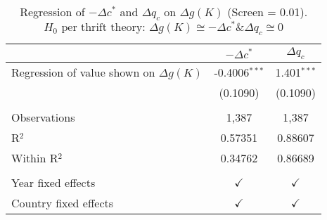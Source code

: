 \begin{table}[pos=h]
\caption{Regression of $- \Delta c^*$ and $\Delta q_c$ on $\Delta g(K)$ (Screen = 0.01). $H_0 \text{ per thrift theory: } \Delta g(K) \cong -\Delta c^* \& \Delta q_c \cong 0$}
\centering
\begin{tabularx}{\columnwidth}{lcc}
   \toprule
                                               & $-\Delta c^*$   & $\Delta q_c$ \\    
   \midrule 
   Regression of value shown on $\Delta g(K)$  & -0.4006$^{***}$ & 1.401$^{***}$\\   
                                               & (0.1090)        & (0.1090)\\   
    \\
   Observations                                & 1,387           & 1,387\\  
   R$^2$                                       & 0.57351         & 0.88607\\  
   Within R$^2$                                & 0.34762         & 0.86689\\  
    \\
   Year fixed effects                          & $\checkmark$    & $\checkmark$\\   
   Country fixed effects                       & $\checkmark$    & $\checkmark$\\   
   \bottomrule
\end{tabularx}
   \label{tbl-wid_c_table}
\end{table}